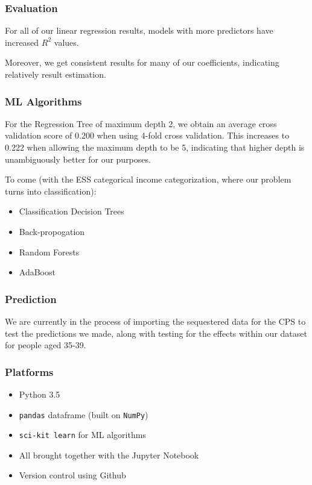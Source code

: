 \documentclass{beamer}
\let\olditem=\item
\renewcommand{\item}{\olditem \justifying}
\begin{document}
  \frame %
  {
  \frametitle{Evaluation}
  
  For all of our linear regression results, models with more predictors have increased $R^2$ values. 
  
  Moreover, we get consistent results for many of our coefficients, indicating relatively result estimation. 
  
  }

%  
%  

\frame %
{
  \frametitle{ML Algorithms}
  
  For the Regression Tree of maximum depth 2, we obtain an average cross validation score of 0.200 when using 4-fold cross validation. This increases to 0.222 when allowing the maximum depth to be 5, indicating that higher depth is unambiguously better for our purposes.
  
  To come (with the ESS categorical income categorization, where our problem turns into classification):
  \begin{itemize}
\item Classification Decision Trees
\item Back-propogation
\item Random Forests
\item AdaBoost
\end{itemize}

  
  
  
}

%  
  
  
  
\frame %
{
  \frametitle{Prediction}
  
  We are currently in the process of importing the sequestered data for the CPS to test the predictions we made, along with testing for the effects within our dataset for people aged 35-39.
  
}

%  



\frame %
{
  \frametitle{Platforms}
  \begin{itemize}
  \item Python 3.5
  \item \texttt{pandas} dataframe (built on \texttt{NumPy})
  \item \texttt{sci-kit learn} for ML algorithms
  \item All brought together with the Jupyter Notebook
  \item Version control using Github
  \end{itemize}
}
\end{document}
